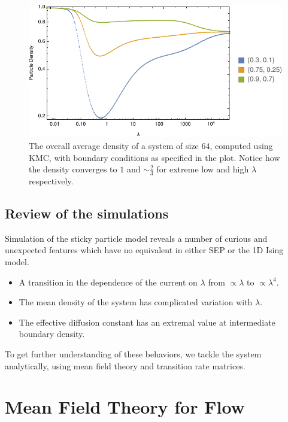 \documentclass[
reprint, amsmath,amssymb,
]{revtex4-1}
\begin{document}
\begin{figure}[h!]
\vspace{0em}
\begin{center}
    \includegraphics[width=1\linewidth]{wideDensProfiles}
\end{center}
    \vspace{-0em}
\caption{\label{fig:wideDensities} The overall average density of a system of size $64$, computed using KMC, with boundary conditions as specified in the plot. Notice how the density converges to $1$ and $\sim \frac{2}{3}$
for extreme low and high $\lambda$ respectively.}
\end{figure}

\subsection{Review of the simulations}

Simulation of the sticky particle model reveals a number of curious
and unexpected features which have no equivalent in either SEP or the
1D Ising model.

\begin{itemize} \item 
A transition in the dependence of the current on $\lambda$ from $\propto \lambda$ to $\propto \lambda^4$.  
\item
The mean density of the system  has complicated variation with  $\lambda$.  
\item 
The effective diffusion constant has an extremal value at
  intermediate boundary density.
\end{itemize}

To get further understanding of these behaviors, we tackle the system
analytically, using mean field theory and transition rate matrices.

\section{Mean Field Theory for Flow}
  
\end{document}
